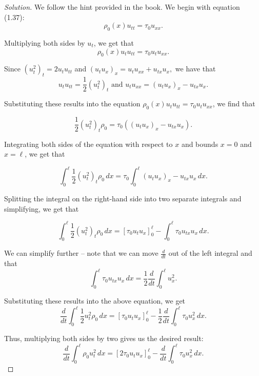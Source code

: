 \documentclass[11pt]{article}
\newenvironment{solution}
  {\renewcommand\qedsymbol{$\blacksquare$}\begin{proof}[Solution]}
  {\end{proof}}
\begin{document}
\begin{solution} 
We follow the hint provided in the book. We begin with equation (1.37): $$ \rho_0 (x) u_{tt} = \tau_0 u_{xx}.$$

Multiplying both sides by $u_t$, we get that $$ \rho_0 (x) u_t u_{tt} = \tau_0 u_t u_{xx}.$$

Since $(u_t^2)_t = 2u_tu_{tt}$ and $(u_tu_x)_x = u_tu_{xx} + u_{tx} u_x,$ we have that $$u_tu_{tt} = \frac{1}{2}\left(u_t^2\right)_t \text { and } u_tu_{xx} = (u_tu_x)_x - u_{tx}u_x.$$

Substituting these results into the equation $ \rho_0 (x) u_t u_{tt} = \tau_0 u_t u_{xx}$, we find that

$$ \frac{1}{2} \left(u_t^2\right)_t \rho_0 = \tau_0 \left( (u_tu_x)_x - u_{tx}u_x\right).$$

Integrating both sides of the equation with respect to $x$ and bounds $x=0$ and $x = \ell$, we get that

$$ \int_0^{\ell} \frac{1}{2} \left(u_t^2\right)_t \rho_0 \, dx = \tau_0 \int_0^{\ell} (u_tu_x)_x - u_{tx} u_x \, dx.$$


Splitting the integral on the right-hand side into two separate integrals and simplifying, we get that

$$ \int_0^{\ell} \frac{1}{2} \left(u_t^2\right)_t \rho_0 \, dx = [\tau_0u_tu_x]_0^{\ell} - \int_0^{\ell} \tau_0u_{tx} u_x \, dx.$$

We can simplify further -- note that we can move $\frac{d}{dt}$ out of the left integral and that $$\int_0^{\ell} \tau_0u_{tx} u_x \, dx = \frac{1}{2} \frac{d}{dt} \int_0^{\ell} u_x^2.$$

Substituting these results into the above equation, we get
$$ \frac{d}{dt} \int_0^{\ell} \frac{1}{2} u_t^2 \rho_0 \, dx = [\tau_0u_tu_x]_0^{\ell} - \frac{1}{2} \frac{d}{dt} \int_0^{\ell} \tau_0u_x^2 \, dx.$$

Thus, multiplying both sides by two gives us the desired result:
$$\frac{d}{dt} \int_{0}^{\ell} \rho_0 u_t^2 \, dx= [2\tau_0u_tu_x]_0^\ell - \frac{d}{dt}  \int_{0}^{\ell} \tau_0 u_x^2 \, dx.$$ 

\end{solution}
\end{document}
